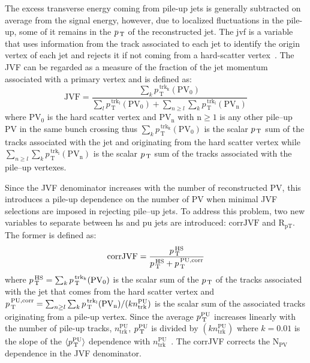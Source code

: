The excess transverse energy coming from pile-up jets is generally subtracted on
average from the signal energy, however, due to localized fluctuations in the
pile-up, some of it remains in the $p_\mathrm{\, T}$ of the reconstructed jet. The \gls{jvf}
is a variable that uses information from the track associated to each jet to
identify the origin vertex of each jet and rejects it if not coming from a
hard-scatter vertex~\cite{JVF}. The JVF can be regarded as a measure of the
fraction of the jet momentum associated with a primary vertex and is defined as:
\begin{equation}
  \label{eq:77}
  \mathrm{JVF} = \frac{\sum_k p_\mathrm{\, T}^\mathrm{\, trk_k}
    (\mathrm{PV_0})}{\sum_l p_\mathrm{\, T}^\mathrm{\, trk_l} (\mathrm{PV_0}) +
    \sum_{n \geq l} \sum_k p_\mathrm{\, T}^\mathrm{\, trk_l} (\mathrm{PV_n})}
\end{equation}
where PV$_0$ is the hard scatter vertex and PV$_\mathrm{n}$ with
$\mathrm{n} \geq 1$ is any other pile--up PV in the same bunch crossing thus
$\sum_k p_\mathrm{\, T}^\mathrm{\, trk_k} (\mathrm{PV_0})$ is the scalar $p_\mathrm{\, T}$
sum of the tracks associated with the jet and originating from the hard scatter
vertex while
$\sum_{n \geq l} \sum_k p_\mathrm{\, T}^\mathrm{\, trk_l} (\mathrm{PV_n})$ is
the scalar $p_\mathrm{\, T}$ sum of the tracks associated with the pile--up vertexes.

Since the JVF denominator increases with the number of reconstructed PV, this
introduces a pile-up dependence on the number of PV when minimal JVF selections
are imposed in rejecting pile--up jets. To address this problem, two new
variables to separate between \gls{hs} and \gls{pu} jets are introduced:
$\mathrm{corrJVF}$ and $\mathrm{R_{pT}}$. The former is defined as:
\begin{equation}
  \label{eq:78}
  \mathrm{corrJVF} = \frac{p_\mathrm{\, T}^{\mathrm{\, HS}}}{p_\mathrm{\, T}^{\, \mathrm{HS}} +
    p_\mathrm{\, T}^{\, \mathrm{PU, corr}}}
\end{equation}
where
$p_\mathrm{\, T}^{\mathrm{\, HS}} = \sum_k p_\mathrm{\, T}^\mathrm{\, trk_k}
(\mathrm{PV_0})$
is the scalar sum of the $p_\mathrm{\, T}$ of the tracks associated with the jet that comes
from the hard scatter vertex and
$p_\mathrm{\, T}^{\, \mathrm{PU, corr}} = \sum_{n \geq l} \sum_k p_\mathrm{\, T}^\mathrm{\,
  trk_l} (\mathrm{PV_n}) / (k n_{\mathrm{trk}}^{\mathrm{PU}})$
is the scalar sum of the associated tracks originating from a pile-up
vertex. Since the average $p_\mathrm{\, T}^{\mathrm{PU}}$ increases linearly with the number
of pile-up tracks, $n_{\mathrm{trk}}^{\mathrm{PU}}$, $p_\mathrm{\, T}^{\mathrm{PU}}$ is
divided by $(kn_{\mathrm{trk}}^{\mathrm{PU}})$ where $k = 0.01$ is the slope of
the $\langle p_\mathrm{\, T}^{\mathrm{PU}} \rangle$ dependence with
$n_{\mathrm{trk}}^{\mathrm{PU}}$~\cite{JVT}. The corrJVF corrects the
N$_\mathrm{PV}$ dependence in the JVF denominator.

